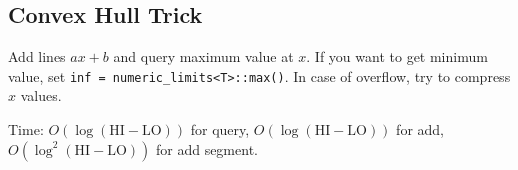 \subsection{Convex Hull Trick}

Add lines $ax + b$ and query maximum value at $x$.
If you want to get minimum value, set \texttt{inf = numeric\_limits<T>::max()}.
In case of overflow, try to compress $x$ values.


Time: $O(\log (\text{HI}-\text{LO}))$ for query, $O(\log (\text{HI}-\text{LO}))$ for add, $O(\log^2 (\text{HI}-\text{LO}))$ for add segment.

